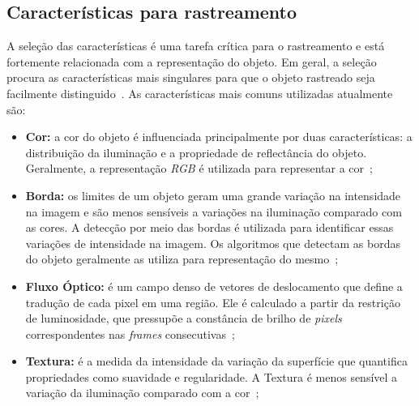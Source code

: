 
\subsection{Características para rastreamento}

	A seleção das características é uma tarefa crítica para o rastreamento e está fortemente relacionada com a representação do objeto. Em geral, a seleção procura as características mais singulares para que o objeto rastreado seja facilmente distinguido~\cite{yilmaz}. As características mais comuns utilizadas atualmente são:

	\begin{itemize}
		\item \textbf{Cor:} a cor do objeto é influenciada principalmente por duas características: a distribuição da iluminação e a propriedade de reflectância do objeto. Geralmente, a representação \textit{RGB} é utilizada para representar a cor~\cite{yilmaz};

		\item \textbf{Borda:} os limites de um objeto geram uma grande variação na intensidade na imagem e são menos sensíveis a variações na iluminação comparado com as cores. A detecção por meio das bordas é utilizada para identificar essas variações de intensidade na imagem. Os algoritmos que detectam as bordas do objeto geralmente as utiliza para representação do mesmo~\cite{yilmaz};

		\item \textbf{Fluxo Óptico:} é um campo denso de vetores de deslocamento que define a tradução de cada pixel em uma região. Ele é calculado a partir da restrição de luminosidade, que pressupõe a constância de brilho de \textit{pixels} correspondentes nas \textit{frames} consecutivas~\cite{yilmaz};

		\item \textbf{Textura:} é a medida da intensidade da variação da superfície que quantifica propriedades como suavidade e regularidade. A Textura é menos sensível a variação da iluminação comparado com a cor~\cite{yilmaz};

	\end{itemize}

